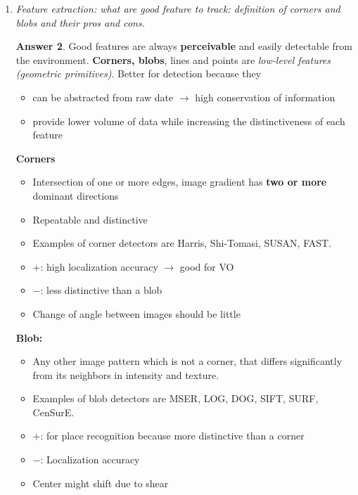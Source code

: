 \documentclass[a4paper,12 pt]{article}
\theoremstyle{definition}
\theoremstyle{remark}
\theoremstyle{definition}
\theoremstyle{definition}
\theoremstyle{definition}
\theoremstyle{definition}
\theoremstyle{remark}
\theoremstyle{remark}
\theoremstyle{definition}
\theoremstyle{definition}
\newtheorem*{answer}{Answer}
\begin{document}
\begin{enumerate}
\begin{answer}
\end{answer}
\item \textit{Feature extraction: what are good feature to track: definition of corners and blobs and their pros and cons.}
\begin{answer}
Good features are always \textbf{perceivable} and easily detectable from the environment. \textbf{Corners, blobs}, lines and points are \textit{low-level features (geometric primitives)}. Better for detection because they 
\begin{itemize}
\item can be abstracted from raw date $\rightarrow$ high conservation of information
\item provide lower volume of data while increasing the distinctiveness of each feature
\end{itemize}

\textbf{Corners}
\begin{itemize}
\item Intersection of one or more edges, image gradient has \textbf{two or more} dominant directions
\item Repeatable and distinctive
\item Examples of corner detectors are Harris, Shi-Tomasi, SUSAN, FAST.
\item $+$: high localization accuracy $\rightarrow$ good for VO
\item $-$: less distinctive than a blob
\item Change of angle between images should be little
\end{itemize}
\textbf{Blob:} 
\begin{itemize}
\item Any other image pattern which is not a corner, that differs significantly from its neighbors in intensity and texture.
\item Examples of blob detectors are MSER, LOG, DOG, SIFT, SURF, CenSurE.
\item $+$: for place recognition because more distinctive than a corner
\item $-$: Localization accuracy
\item Center might shift due to shear
\end{itemize}


\end{answer}
\end{enumerate}
\end{document}

